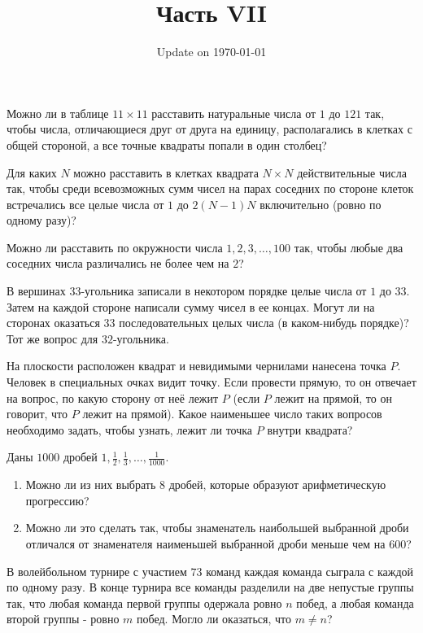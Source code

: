 \documentclass[12pt]{article}
\begin{document}
\fontsize{12}{12}\selectfont

\title{\bf \huge Часть VII}
\date{Update on \today}
\maketitle 

\begin{task}
Можно ли в таблице $11 \times 11$ расставить натуральные числа от $1$ до $121$ так, чтобы числа, отличающиеся друг от друга на единицу, располагались в клетках с общей стороной, а все точные квадраты попали в один столбец? 
\end{task}

\begin{task}
Для каких $N$ можно расставить в клетках квадрата $N \times N$ действительные числа так, чтобы среди всевозможных сумм чисел на парах соседних по стороне клеток встречались все целые числа от $1$ до $2(N-1)N$ включительно (ровно по одному разу)?
\end{task}

\begin{task}
Можно ли расставить по окружности числа $1, 2, 3, \dots, 100$ так, чтобы любые два соседних числа различались не более чем на $2$?
\end{task}

\begin{task}
В вершинах $33$-угольника записали в некотором порядке целые числа от $1$ до $33$. Затем на каждой стороне написали сумму чисел в ее концах. Могут ли на сторонах оказаться $33$ последовательных целых числа (в каком-нибудь порядке)? Тот же вопрос для $32$-угольника.
\end{task}

\begin{task}
На плоскости расположен квадрат и невидимыми чернилами нанесена точка $P$. Человек в специальных очках видит точку. Если провести прямую, то он отвечает на вопрос, по какую сторону от неё лежит $P$ (если $P$ лежит на прямой, то он говорит, что $P$ лежит на прямой). Какое наименьшее число таких вопросов необходимо задать, чтобы узнать, лежит ли точка $P$ внутри квадрата? 
\end{task}

\begin{task}
Даны $1000$ дробей $1, \frac{1}{2}, \frac{1}{3}, \dots, \frac{1}{1000}$.
\begin{enumerate}
\item Можно ли из них выбрать $8$ дробей, которые образуют арифметическую прогрессию?
\item Можно ли это сделать так, чтобы знаменатель наибольшей выбранной дроби отличался от знаменателя наименьшей выбранной дроби меньше чем на $600$?
\end{enumerate}
\end{task}

\begin{task}
В волейбольном турнире с участием $73$ команд каждая команда сыграла с каждой по одному разу. В конце турнира все команды разделили на две непустые группы так, что любая команда первой группы одержала ровно $n$ побед, а любая команда второй группы - ровно $m$ побед. Могло ли оказаться, что $m \neq n$?
\end{task}
\end{document}

